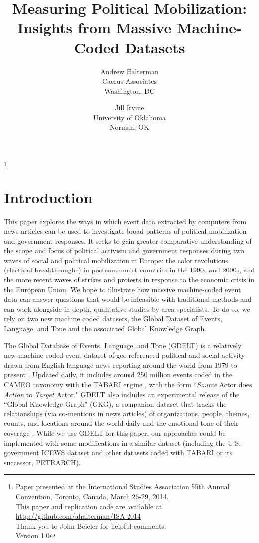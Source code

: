 \documentclass[10pt]{article}
\author{
Andrew Halterman\\
Caerus Associates\\
Washington, DC
\and
Jill Irvine\\
University of Oklahoma\\
Norman, OK\\
}
\title{Measuring Political Mobilization: Insights from Massive Machine-Coded Datasets}
\date{}
\newcommand\blfootnote[1]{%
\begingroup \renewcommand\thefootnote{}\footnote{#1}%
\addtocounter{footnote}{-1}%
\endgroup}
\begin{document}
\maketitle
\blfootnote{\noindent Paper presented at the International Studies Association 55th Annual Convention, Toronto, Canada, March 26-29, 2014.\\ This paper and replication code are available at \url{http://github.com/ahalterman/ISA-2014}\\ Thank you to John Beieler for helpful comments. \\Version 1.0}




\section{Introduction}

This paper explores the ways in which event data extracted by computers from news articles can be used to investigate broad patterns of political mobilization and government responses. It seeks to gain greater comparative understanding of the scope and focus of political activism and government responses during two waves of social and political mobilization in Europe: the color revolutions (electoral breakthroughs) in postcommunist countries in the 1990s and 2000s, and the more recent waves of strikes and protests in response to the economic crisis in the European Union.  We hope to illustrate how massive machine-coded event data can answer questions that would be infeasible with traditional methods and can work alongside in-depth, qualitative studies by area specialists. To do so, we rely on two new machine coded datasets, the Global Dataset of Events, Language, and Tone and the associated Global Knowledge Graph.

The Global Database of Events, Language, and Tone (GDELT) is a relatively new machine-coded event dataset of geo-referenced political and social activity drawn from English language news reporting around the world from 1979 to present \citep{leetaru2013}. Updated daily, it includes around 250 million events coded in the CAMEO taxonomy \citep{gerner2002} with the TABARI engine \citep{schrodt2011tabari}, with the form ``\emph{Source} Actor does \emph{Action} to \emph{Target} Actor." GDELT also includes an experimental release of the ``Global Knowledge Graph" (GKG), a companion dataset that tracks the relationships (via co-mentions in news articles) of organizations, people, themes, counts, and locations around the world daily and the emotional tone of their coverage \citep{leetaru2013gkg}. While we use GDELT for this paper, our approaches could be implemented with some modifications in a similar dataset (including the U.S. government ICEWS dataset and other datasets coded with TABARI or its successor, PETRARCH).
\end{document}
